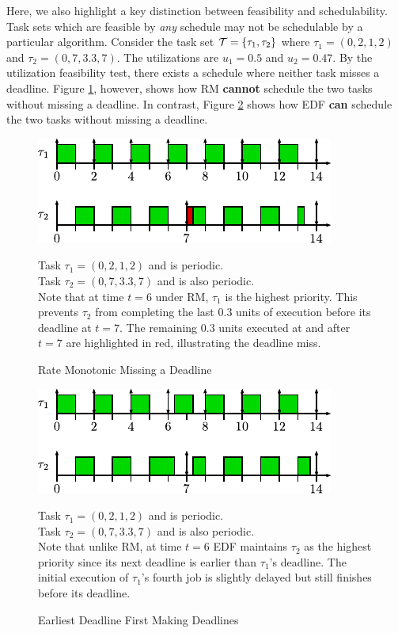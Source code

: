 Here, we also highlight a key distinction between feasibility and schedulability.
Task sets which are feasible by \textit{any} schedule may not be schedulable by a particular algorithm.
Consider the task set $\mathcal{T} = \{\tau_1, \tau_2\}$ where $\tau_1 = (0,2,1,2)$ and $\tau_2 = (0,7,3.3,7)$.
The utilizations are $u_1 = 0.5$ and $u_2 = 0.47$.
By the utilization feasibility test, there exists a schedule where neither task misses a deadline.
Figure \ref{fig:rmNotSchedulable}, however, shows how RM \textbf{cannot} schedule the two tasks without missing a deadline.
In contrast, Figure \ref{fig:edfSchedulable} shows how EDF \textbf{can} schedule the two tasks without missing a deadline.

\begin{figure}[!htbp]
    \centering
    \includegraphics[width=0.75\linewidth]{fig/rmNotSchedulable.pdf}
    \caption{Rate Monotonic Missing a Deadline}
    Task $\tau_1 = (0,2,1,2)$ and is periodic.\\
    Task $\tau_2 = (0,7,3.3,7)$ and is also periodic.\\
    Note that at time $t=6$ under RM, $\tau_1$ is the highest priority.
    This prevents $\tau_2$ from completing the last $0.3$ units of execution before its deadline at $t=7$.
    The remaining $0.3$ units executed at and after $t=7$ are highlighted in red, illustrating the deadline miss.
    \label{fig:rmNotSchedulable}
\end{figure}

\begin{figure}[!htbp]
    \centering
    \includegraphics[width=0.75\linewidth]{fig/edfSchedulable.pdf}
    \caption{Earliest Deadline First Making Deadlines}
    Task $\tau_1 = (0,2,1,2)$ and is periodic.\\
    Task $\tau_2 = (0,7,3.3,7)$ and is also periodic.\\
    Note that unlike RM, at time $t=6$ EDF maintains $\tau_2$ as the highest priority since its next deadline is earlier than $\tau_1$'s deadline.
    The initial execution of $\tau_1$'s fourth job is slightly delayed but still finishes before its deadline.
    \label{fig:edfSchedulable}
\end{figure}

